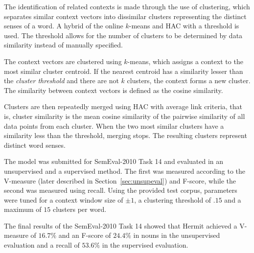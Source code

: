 The identification of related contexts is made through the use of clustering,
which separates similar context vectors into dissimilar clusters representing
the distinct senses of a word. A hybrid of the online $k$-means and \ac{HAC}
with a threshold is used. The threshold allows for the number of clusters to be
determined by data similarity instead of manually specified.

The context vectors are clustered using $k$-means, which assigns a context to
the most similar cluster centroid. If the nearest centroid has a similarity
lesser than the \textit{cluster threshold} and there are not $k$ clusters, the
context forms a new cluster. The similarity between context vectors is defined
as the cosine similarity.

Clusters are then repeatedly merged using \ac{HAC} with average link criteria,
that is, cluster similarity is the mean cosine similarity of the pairwise
similarity of all data points from each cluster. When the two most similar
clusters have a similarity less than the threshold, merging stops. The resulting
clusters represent distinct word senses.

The model was submitted for SemEval-2010 Task 14 \cite{manandhar2009semeval}
and evaluated in an unsupervised and a supervised method. The first was measured
according to the V-measure (later described in Section~\ref{sec:unsupeval}) and
F-score, while the second was measured using recall. Using the provided test
corpus, parameters were tuned for a context window size of $\pm1$, a clustering
threshold of $.15$ and a maximum of $15$ clusters per word.

The final results of the SemEval-2010 Task 14 showed that Hermit achieved a
V-measure of $16.7\%$ and an F-score of $24.4\%$ in nouns in the unsupervised
evaluation and a recall of $53.6\%$ in the supervised evaluation.



